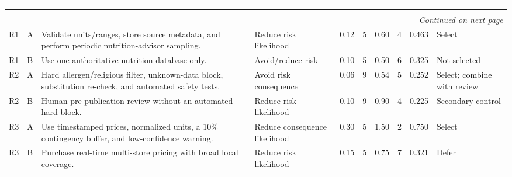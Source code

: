\documentclass[11pt,a4paper]{article}
\renewcommand{\arraystretch}{1.15}
\begin{document}
\begin{landscape}
\begin{center}
\scriptsize
\setlength{\tabcolsep}{2.5pt}
\renewcommand{\arraystretch}{1.18}
\begin{longtable}{|p{0.7cm}|p{0.6cm}|p{6.0cm}|p{3.2cm}|p{1.1cm}|p{1.1cm}|p{1.3cm}|p{1.3cm}|p{1.1cm}|p{3.0cm}|}
\hline
\rowcolor{headerblue} \textbf{\color{white}{Risk}} & \textbf{\color{white}{Alt.}} & \textbf{\color{white}{Countermeasure}} & \textbf{\color{white}{Tactic}} & \textbf{\color{white}{Residual P}} & \textbf{\color{white}{Residual S}} & \textbf{\color{white}{Residual RE}} & \textbf{\color{white}{Cost points}} & \textbf{\color{white}{RRL}} & \textbf{\color{white}{Decision}} \\ \hline
\endfirsthead
\hline
\rowcolor{headerblue} \textbf{\color{white}{Risk}} & \textbf{\color{white}{Alt.}} & \textbf{\color{white}{Countermeasure}} & \textbf{\color{white}{Tactic}} & \textbf{\color{white}{Residual P}} & \textbf{\color{white}{Residual S}} & \textbf{\color{white}{Residual RE}} & \textbf{\color{white}{Cost points}} & \textbf{\color{white}{RRL}} & \textbf{\color{white}{Decision}} \\ \hline
\endhead
\hline
\multicolumn{10}{r}{\small\itshape Continued on next page}\\
\endfoot
\hline
\endlastfoot
R1 & A & Validate units/ranges, store source metadata, and perform periodic nutrition-advisor sampling. & Reduce risk likelihood & 0.12 & 5 & 0.60 & 4 & 0.463 & Select \\ \hline
R1 & B & Use one authoritative nutrition database only. & Avoid/reduce risk & 0.10 & 5 & 0.50 & 6 & 0.325 & Not selected \\ \hline
R2 & A & Hard allergen/religious filter, unknown-data block, substitution re-check, and automated safety tests. & Avoid risk consequence & 0.06 & 9 & 0.54 & 5 & 0.252 & Select; combine with review \\ \hline
R2 & B & Human pre-publication review without an automated hard block. & Reduce risk likelihood & 0.10 & 9 & 0.90 & 4 & 0.225 & Secondary control \\ \hline
R3 & A & Use timestamped prices, normalized units, a 10\% contingency buffer, and low-confidence warning. & Reduce consequence likelihood & 0.30 & 5 & 1.50 & 2 & 0.750 & Select \\ \hline
R3 & B & Purchase real-time multi-store pricing with broad local coverage. & Reduce risk likelihood & 0.15 & 5 & 0.75 & 7 & 0.321 & Defer \\ \hline

\end{longtable}
\end{center}
\end{landscape}
\end{document}
